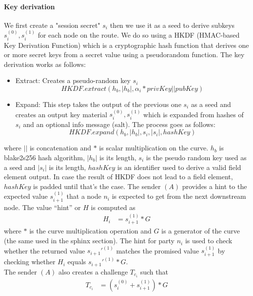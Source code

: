     \paragraph{Key derivation}
    We first create a "session secret" $s_i$ then we use it as a seed to derive subkeys $s_i^{(0)},s_i^{(1)}$ for each node on the route. We do so using a HKDF (HMAC-based Key Derivation Function) which is a cryptographic hash function that derives one or more secret keys from a secret value using a pseudorandom function. The key derivation works as follows:
    \begin{itemize}
        \item Extract: Creates a pseudo-random key $s_i$   
        $$HKDF.extract(h_b, |h_b|, \alpha_i* privKey || pubKey)$$   

        \item Expand: This step takes the output of the previous one $s_i$ as a seed and creates an output key material $s_i^{(0)},s_i^{(1)}$ which is expanded from hashes of $s_i$ and an optional info message (salt). The process goes as follows:
        $$HKDF.expand(h_b, |h_b|,s_i, |s_i|, hashKey)$$
    \end{itemize}
    where $||$ is concatenation and $*$ is scalar multiplication on the curve. $h_b$ is blake2s256 hash algorithm, $|h_b|$ is its length, $s_i$ is the pseudo random key used as a seed and $|s_i|$ is its length, $hashKey$ is an identifier used to derive a valid field element output. In case the result of HKDF does not lead to a field element, $hashKey$ is padded until that's the case.
    \newline The sender $(A)$ provides a hint to the expected value $s_{i+1}^{(1)}$ that a node $n_i$ is expected to get from the next downstream node.
    The value “hint” or $H$ is computed as 
    \begin{align}  
        H_i&=s_{i+1}^{(1)}*G
         \end{align}
    where $*$ is the curve multiplication operation and $G$ is a generator of the curve (the same used in the sphinx section). 
    \newline The hint for party $n_i$ is used to check whether the returned value $s_{i+1}'^{(1)}$ matches the promised value $s_{i+1}^{(1)}$ by checking whether $H_i$ equals $s_{i+1}'^{(1)}*G$. 
   \\The sender $(A)$ also creates a challenge $T_{c_i}$ such that 
   \begin{align}  
    T_{c_i}&=(s_i^{(0)}+s_{i+1}^{(1)})*G
     \end{align}
